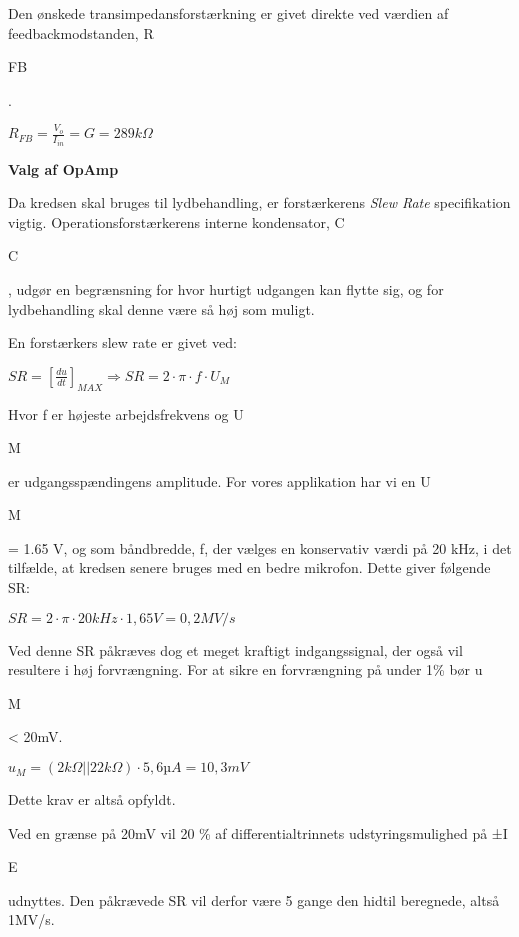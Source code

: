 Den ønskede transimpedansforstærkning er givet direkte ved værdien af feedbackmodstanden, R\begin{tiny}FB\end{tiny}.
\begin{center}
${ R }_{ FB }=\frac { { V }_{ o } }{ { I }_{ in } } =G=289k\Omega$
\end{center}

\textbf{Valg af OpAmp}

Da kredsen skal bruges til lydbehandling, er forstærkerens \textit{Slew Rate} specifikation vigtig.
Operationsforstærkerens interne kondensator, C\begin{tiny}C\end{tiny}, udgør en begrænsning for hvor hurtigt udgangen kan flytte sig, og for lydbehandling skal denne være så høj som muligt.

En forstærkers slew rate er givet ved:
\begin{center}
$SR={ \left[ \frac { du }{ dt }  \right]  }_{ MAX }\Rightarrow SR=2\cdot \pi \cdot f\cdot { U }_{ M }$
\end{center}
Hvor f er højeste arbejdsfrekvens og U\begin{tiny}M\end{tiny} er udgangsspændingens amplitude.
For vores applikation har vi en U\begin{tiny}M\end{tiny} = 1.65 V, og som båndbredde, f, der vælges en konservativ værdi på 20 kHz, i det tilfælde, at kredsen senere bruges med en bedre mikrofon. Dette giver følgende SR:
\begin{center}
$SR=2\cdot \pi \cdot 20kHz\cdot 1,65V=0,2MV/s$
\end{center}

Ved denne SR påkræves dog et meget kraftigt indgangssignal, der også vil resultere i høj forvrængning. For at sikre en forvrængning på under 1\% bør u\begin{tiny}M\end{tiny} < 20mV.
\begin{center}
${ u }_{ M }=(2k\Omega ||22k\Omega )\cdot { 5,6µA=10,3mV }$
\end{center}
Dette krav er altså opfyldt.

Ved en grænse på 20mV vil 20 \% af differentialtrinnets udstyringsmulighed på ±I\begin{tiny}E\end{tiny} udnyttes. Den påkrævede SR vil derfor være 5 gange den hidtil beregnede, altså 1MV/s.

